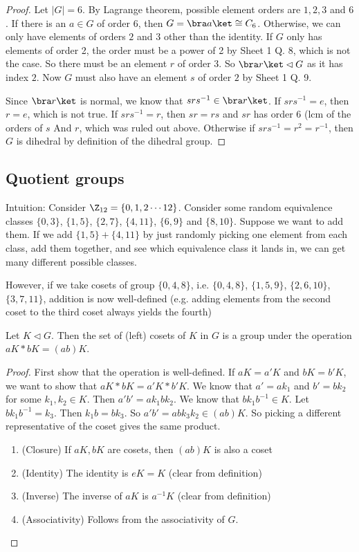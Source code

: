 \documentclass[a4paper]{article}
\begin{document}
  \begin{proof}
    Let $|G| = 6$. By Lagrange theorem, possible element orders are $1, 2, 3$ and $6$. If there is an $a\in G$ of order $6$, then $G = \bra a\ket \cong C_6$. Otherwise, we can only have elements of orders $2$ and $3$ other than the identity. If $G$ only has elements of order 2, the order must be a power of 2 by Sheet 1 Q. 8, which is not the case. So there must be an element $r$ of order 3. So $\bra r\ket\lhd G$ as it has index $2$. Now $G$ must also have an element $s$ of order $2$ by Sheet 1 Q. 9.

    Since $\bra r\ket$ is normal, we know that $srs^{-1}\in \bra r\ket$. If $srs^{-1} = e$, then $r = e$, which is not true. If $srs^{-1} = r$, then $sr = rs$ and $sr$ has order $6$ (lcm of the orders of $s$ And $r$, which was ruled out above. Otherwise if $srs^{-1} = r^2 = r^{-1}$, then $G$ is dihedral by definition of the dihedral group.
  \end{proof}

  \subsection{Quotient groups}
  Intuition: Consider $\Z_{12} = \{0, 1, 2\cdots 12\}$. Consider some random equivalence classes $\{0, 3\}$, $\{1, 5\}$, $\{2, 7\}$, $\{4, 11\}$, $\{6, 9\}$ and $\{8, 10\}$. Suppose we want to add them. If we add $\{1, 5\} + \{4, 11\}$ by just randomly picking one element from each class, add them together, and see which equivalence class it lands in, we can get many different possible classes.

  However, if we take cosets of group $\{0, 4, 8\}$, i.e. $\{0, 4, 8\}$, $\{1, 5, 9\}$, $\{2, 6, 10\}$, $\{3, 7, 11\}$, addition is now well-defined (e.g. adding elements from the second coset to the third coset always yields the fourth)

  \begin{prop}
    Let $K\lhd G$. Then the set of (left) cosets of $K$ in $G$ is a group under the operation $aK*bK = (ab)K$.
  \end{prop}

  \begin{proof}
    First show that the operation is well-defined. If $aK = a'K$ and $bK = b'K$, we want to show that $aK*bK = a'K * b'K$. We know that $a' = ak_1$ and $b' = bk_2$ for some $k_1, k_2\in K$. Then $a'b' = ak_1bk_2$. We know that $bk_1b^{-1}\in K$. Let $bk_1b^{-1} = k_3$. Then $k_1 b = bk_3$. So $a'b' = abk_3k_2\in (ab)K$. So picking a different representative of the coset gives the same product.
    \begin{enumerate}[label=\arabic{*}.]
      \item (Closure) If $aK, bK$ are cosets, then $(ab)K$ is also a coset
      \item (Identity) The identity is $eK = K$ (clear from definition)
      \item (Inverse) The inverse of $aK$ is $a^{-1}K$ (clear from definition)
      \item (Associativity) Follows from the associativity of $G$.
    \end{enumerate}
  \end{proof}
\end{document}
